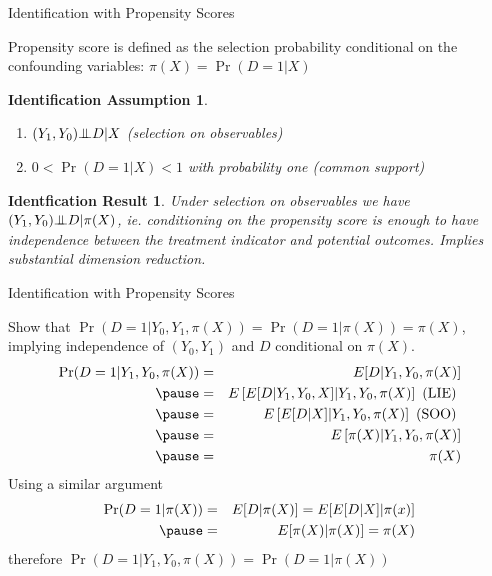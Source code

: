 \documentclass{beamer}
\numberwithin{equation}{section}
\newtheorem{iass}{Identification Assumption}
\newtheorem{ires}{Identfication Result}
\newcommand{\indep}{{\bot\negthickspace\negthickspace\bot}}
\begin{document}
\begin{frame}{Identification with Propensity Scores}

\begin{definition}
Propensity score is defined as the selection probability conditional on the confounding variables:
$\pi(X)=\Pr(D=1|X)$
\end{definition}

\begin{iass}
\begin{enumerate}
\item $(Y_1,Y_0) \indep D |X$ (selection on observables)
\item $0<\Pr(D=1|X)<1$ with probability one (common support)
\end{enumerate}
\end{iass}

\begin{ires}
Under selection on observables we have $(Y_1,Y_0) \indep D| \pi(X)$, ie. conditioning
on the propensity score is enough to have independence between the treatment indicator and potential outcomes. Implies substantial dimension reduction.
\end{ires}

\end{frame}

\begin{frame}{Identification with Propensity Scores}

\begin{Proof}
\small
Show that $\Pr(D = 1|Y_0, Y_1, \pi(X)) = \Pr(D = 1|\pi(X)) = \pi(X)$, implying
independence of $(Y_0,Y_1)$ and $D$ conditional on $\pi(X)$.
\begin{eqnarray*}
\Pr(D=1|Y_1,Y_0,\pi(X))&=&E[D|Y_1,Y_0,\pi(X)]\\ \pause
&=&E\left[E[D|Y_1,Y_0,X]|Y_1,Y_0,\pi(X)\right] \mbox{ (LIE) }\\ \pause
&=&E\left[E[D|X]|Y_1,Y_0,\pi(X)\right] \mbox{ (SOO) } \\\pause
&=&E\left[\pi(X)|Y_1,Y_0,\pi(X)\right] \\ \pause
&=&\pi(X)
\end{eqnarray*}
Using a similar argument
\begin{eqnarray*}
\Pr(D=1|\pi(X))&=&E[D|\pi(X)]=E[E[D|X]|\pi(x)]\\ \pause
&=&E[\pi(X)|\pi(X)]=\pi(X)
\end{eqnarray*}
therefore $\Pr(D=1|Y_1,Y_0,\pi(X))=\Pr(D=1|\pi(X))$
\end{Proof}

\end{frame}
\end{document}
